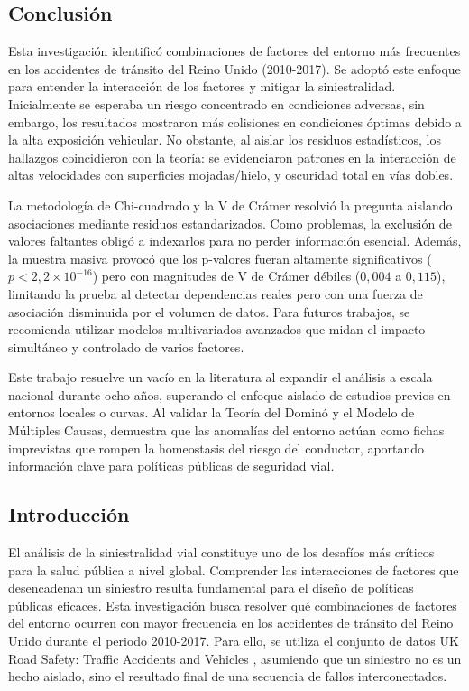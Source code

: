 \documentclass[12pt]{article}
\begin{document}
\subsection{Conclusión}
Esta investigación identificó combinaciones de factores del entorno más frecuentes en los accidentes de tránsito del Reino Unido (2010-2017). Se adoptó este enfoque para entender la interacción de los factores y mitigar la siniestralidad. Inicialmente se esperaba un riesgo concentrado en condiciones adversas, sin embargo, los resultados mostraron más colisiones en condiciones óptimas debido a la alta exposición vehicular. No obstante, al aislar los residuos estadísticos, los hallazgos coincidieron con la teoría: se evidenciaron patrones en la interacción de altas velocidades con superficies mojadas/hielo, y oscuridad total en vías dobles.

La metodología de Chi-cuadrado y la V de Crámer resolvió la pregunta aislando asociaciones mediante residuos estandarizados. Como problemas, la exclusión de valores faltantes obligó a indexarlos para no perder información esencial. Además, la muestra masiva provocó que los p-valores fueran altamente significativos ($p < 2,2 \times 10^{-16}$) pero con magnitudes de V de Crámer débiles ($0,004$ a $0,115$), limitando la prueba al detectar dependencias reales pero con una fuerza de asociación disminuida por el volumen de datos. Para futuros trabajos, se recomienda utilizar modelos multivariados avanzados que midan el impacto simultáneo y controlado de varios factores.

Este trabajo resuelve un vacío en la literatura al expandir el análisis a escala nacional durante ocho años, superando el enfoque aislado de estudios previos en entornos locales o curvas. Al validar la Teoría del Dominó y el Modelo de Múltiples Causas, demuestra que las anomalías del entorno actúan como fichas imprevistas que rompen la homeostasis del riesgo del conductor, aportando información clave para políticas públicas de seguridad vial.

\subsection{Introducción}
El análisis de la siniestralidad vial constituye uno de los desafíos más críticos para la salud pública a nivel global. Comprender las interacciones de factores que desencadenan un siniestro resulta fundamental para el diseño de políticas públicas eficaces. Esta investigación busca resolver qué combinaciones de factores del entorno ocurren con mayor frecuencia en los accidentes de tránsito del Reino Unido durante el periodo 2010-2017. Para ello, se utiliza el conjunto de datos UK Road Safety: Traffic Accidents and Vehicles , asumiendo que un siniestro no es un hecho aislado, sino el resultado final de una secuencia de fallos interconectados.
\end{document}
